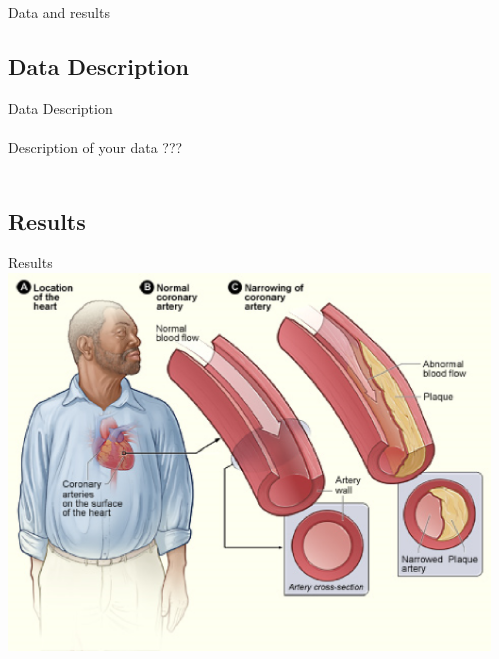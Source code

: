 \documentclass{beamer}
\begin{document}
\begin{frame}{Data and results}
\subsection{Data Description}
\begin{block}{Data Description}
~~\\
~~\\
Description of your data ???
~~\\
~~\\
\end{block}
\subsection{Results}%
\begin{block}{Results}
\centering
\includegraphics[height = 10cm]{im/chd1}
\end{block}
\end{frame}
\end{document}
